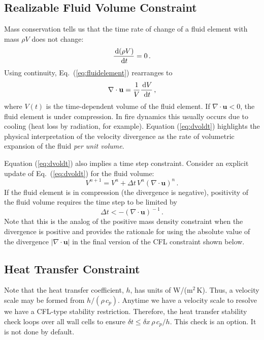 \subsection{Realizable Fluid Volume Constraint}

Mass conservation tells us that the time rate of change of a fluid element with mass $\rho V$ does not change:
\begin{equation}
\label{eq:fluidelement}
\frac{\,\mathrm{d} (\rho V)}{\,\mathrm{d} t} = 0 \,\mbox{.}
\end{equation}
Using continuity, Eq.~(\ref{eq:fluidelement}) rearranges to
\begin{equation}
\label{eq:dvoldt}
\nabla\cdot\mathbf{u} = \frac{1}{V} \frac{\,\mathrm{d} V}{\,\mathrm{d} t} \,\mbox{,}
\end{equation}
where $V(t)$ is the time-dependent volume of the fluid element.  If $\nabla\cdot\mathbf{u}<0$, the fluid element is under compression.  In fire dynamics this usually occurs due to cooling (heat loss by radiation, for example).  Equation (\ref{eq:dvoldt}) highlights the physical interpretation of the velocity divergence as the rate of volumetric expansion of the fluid \emph{per unit volume}.

Equation (\ref{eq:dvoldt}) also implies a time step constraint.  Consider an explicit update of Eq.~(\ref{eq:dvoldt}) for the fluid volume:
\begin{equation}
V^{n+1} = V^n + \Delta t \, V^n (\nabla\cdot\mathbf{u})^{\!n} \,\mbox{.}
\end{equation}
If the fluid element is in compression (the divergence is negative), positivity of the fluid volume requires the time step to be limited by
\begin{equation}
\label{eq:volumedtrestriction}
\Delta t < -(\nabla\cdot\mathbf{u})^{\!-1} \,\mbox{.}
\end{equation}
Note that this is the analog of the positive mass density constraint when the divergence is positive and provides the rationale for using the absolute value of the divergence $|\nabla\cdot\mathbf{u}|$ in the final version of the CFL constraint shown below.

\subsection{Heat Transfer Constraint}

Note that the heat transfer coefficient, $h$, has units of W/(m$^2$\,K).  Thus, a velocity scale may be formed from $h/(\rho\, c_p)$.  Anytime we have a velocity scale to resolve we have a CFL-type stability restriction.  Therefore, the heat transfer stability check loops over all wall cells to ensure $\delta t \le \delta x \,\rho \,c_p/h$.  This check is an option. It is not done by default.


